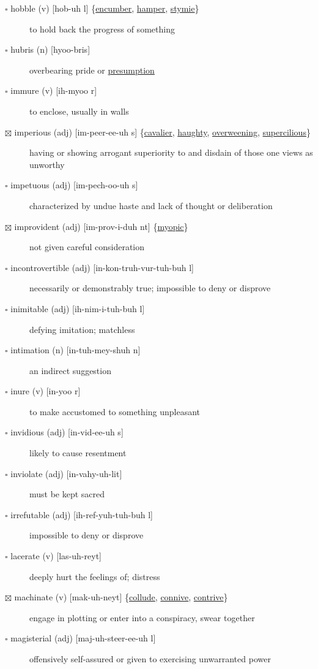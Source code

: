\documentclass[11pt]{article}
\begin{document}
\begin{description}
\item[{$\square$ \label{org9c8bffd}hobble (v) [hob-uh l] \{\hyperref[org33c332c]{encumber}, \hyperref[org9f73bfc]{hamper}, \hyperref[orgeb01fe1]{stymie}\}}] to hold back the progress of something
\item[{$\square$ hubris (n) [hyoo-bris]}] overbearing pride or \hyperref[org8e41497]{presumption}
\item[{$\square$ immure (v) [ih-myoo r]}] to enclose, usually in walls
\item[{$\boxtimes$ \label{org21b1cf6}imperious (adj) [im-peer-ee-uh s] \{\hyperref[org3d40184]{cavalier}, \hyperref[org7951d4f]{haughty}, \hyperref[orgd0e4f1a]{overweening}, \hyperref[org457da96]{supercilious}\}}] having or showing arrogant superiority to and disdain of those one views as unworthy
\item[{$\square$ impetuous (adj) [im-pech-oo-uh s]}] characterized by undue haste and lack of thought or deliberation
\item[{$\boxtimes$ \label{org80fefb0}improvident (adj) [im-prov-i-duh nt] \{\hyperref[org7f20f58]{myopic}\}}] not given careful consideration
\item[{$\square$ incontrovertible (adj) [in-kon-truh-vur-tuh-buh l]}] necessarily or demonstrably true; impossible to deny or disprove
\item[{$\square$ inimitable (adj) [ih-nim-i-tuh-buh l]}] defying imitation; matchless
\item[{$\square$ intimation (n) [in-tuh-mey-shuh n]}] an indirect suggestion
\item[{$\square$ inure (v) [in-yoo r]}] to make accustomed to something unpleasant
\item[{$\square$ invidious (adj) [in-vid-ee-uh s]}] likely to cause resentment
\item[{$\square$ inviolate (adj) [in-vahy-uh-lit]}] must be kept sacred
\item[{$\square$ irrefutable (adj) [ih-ref-yuh-tuh-buh l]}] impossible to deny or disprove
\item[{$\square$ lacerate (v) [las-uh-reyt]}] deeply hurt the feelings of; distress
\item[{$\boxtimes$ \label{org1de71f4}machinate (v) [mak-uh-neyt] \{\hyperref[org361c5c0]{collude}, \hyperref[org035e640]{connive}, \hyperref[org00c2b28]{contrive}\}}] engage in plotting or enter into a conspiracy, swear together
\item[{$\square$ magisterial (adj) [maj-uh-steer-ee-uh l]}] offensively self-assured or given to exercising unwarranted power

\end{description}
\end{document}
